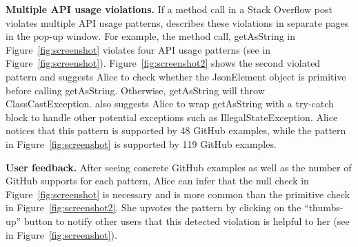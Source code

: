 {\bf Multiple API usage violations.} If a method call in a Stack Overflow post violates multiple API usage patterns, {\tool} describes these violations in separate pages in the pop-up window. For example, the method call, {\ttt getAsString} in Figure~\ref{fig:screenshot} violates four API usage patterns (see  in Figure~\ref{fig:screenshot}). Figure~\ref{fig:screenshot2} shows the second violated pattern and suggests Alice to check whether the {\ttt JsonElement} object is primitive before calling {\ttt getAsString}. Otherwise, {\ttt getAsString} will throw {\ttt ClassCastException}. {\tool} also suggests Alice to wrap {\ttt getAsString} with a try-catch block to handle other potential exceptions such as {\ttt IllegalStateException}. Alice notices that this pattern is supported by 48 GitHub examples, while the pattern in Figure~\ref{fig:screenshot} is supported by 119 GitHub examples.

{\bf User feedback.} After seeing concrete GitHub examples as well as the number of GitHub supports for each pattern, Alice can infer that the {\ttt null} check in Figure~\ref{fig:screenshot} is necessary and is more common than the primitive check in Figure~\ref{fig:screenshot2}. She upvotes the pattern by clicking on the ``thumbs-up'' button to notify other users that this detected violation is helpful to her (see  in Figure~\ref{fig:screenshot}). %


